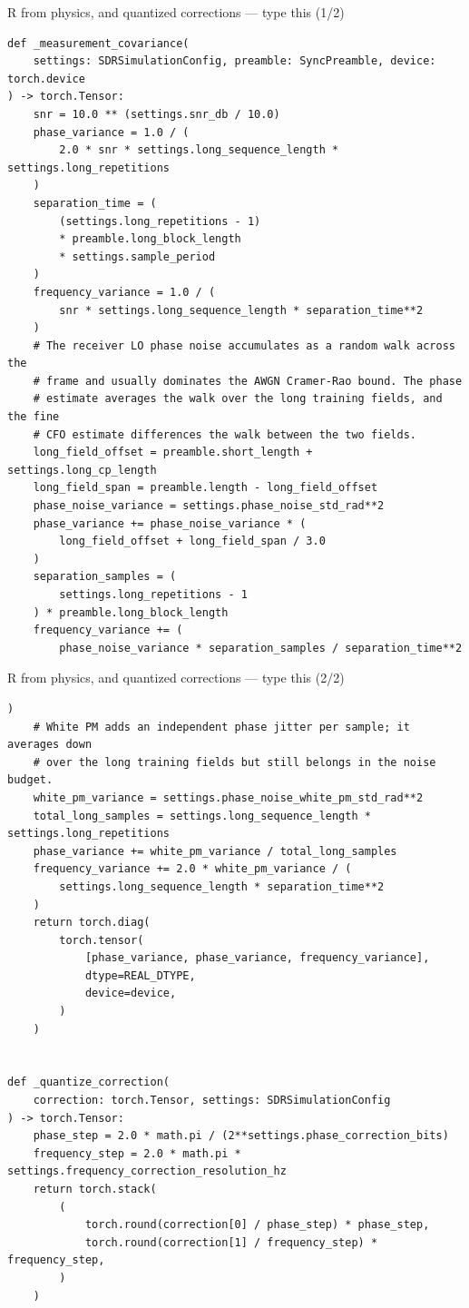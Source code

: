 \documentclass[10pt]{beamer}
\begin{document}
\begin{frame}[fragile]{R from physics, and quantized corrections --- type this (1/2)}
\begin{lstlisting}[basicstyle=\ttfamily\tiny]
def _measurement_covariance(
    settings: SDRSimulationConfig, preamble: SyncPreamble, device: torch.device
) -> torch.Tensor:
    snr = 10.0 ** (settings.snr_db / 10.0)
    phase_variance = 1.0 / (
        2.0 * snr * settings.long_sequence_length * settings.long_repetitions
    )
    separation_time = (
        (settings.long_repetitions - 1)
        * preamble.long_block_length
        * settings.sample_period
    )
    frequency_variance = 1.0 / (
        snr * settings.long_sequence_length * separation_time**2
    )
    # The receiver LO phase noise accumulates as a random walk across the
    # frame and usually dominates the AWGN Cramer-Rao bound. The phase
    # estimate averages the walk over the long training fields, and the fine
    # CFO estimate differences the walk between the two fields.
    long_field_offset = preamble.short_length + settings.long_cp_length
    long_field_span = preamble.length - long_field_offset
    phase_noise_variance = settings.phase_noise_std_rad**2
    phase_variance += phase_noise_variance * (
        long_field_offset + long_field_span / 3.0
    )
    separation_samples = (
        settings.long_repetitions - 1
    ) * preamble.long_block_length
    frequency_variance += (
        phase_noise_variance * separation_samples / separation_time**2
\end{lstlisting}
\end{frame}

\begin{frame}[fragile]{R from physics, and quantized corrections --- type this (2/2)}
\begin{lstlisting}[basicstyle=\ttfamily\tiny]
    )
    # White PM adds an independent phase jitter per sample; it averages down
    # over the long training fields but still belongs in the noise budget.
    white_pm_variance = settings.phase_noise_white_pm_std_rad**2
    total_long_samples = settings.long_sequence_length * settings.long_repetitions
    phase_variance += white_pm_variance / total_long_samples
    frequency_variance += 2.0 * white_pm_variance / (
        settings.long_sequence_length * separation_time**2
    )
    return torch.diag(
        torch.tensor(
            [phase_variance, phase_variance, frequency_variance],
            dtype=REAL_DTYPE,
            device=device,
        )
    )


def _quantize_correction(
    correction: torch.Tensor, settings: SDRSimulationConfig
) -> torch.Tensor:
    phase_step = 2.0 * math.pi / (2**settings.phase_correction_bits)
    frequency_step = 2.0 * math.pi * settings.frequency_correction_resolution_hz
    return torch.stack(
        (
            torch.round(correction[0] / phase_step) * phase_step,
            torch.round(correction[1] / frequency_step) * frequency_step,
        )
    )
\end{lstlisting}
\end{frame}
\end{document}
